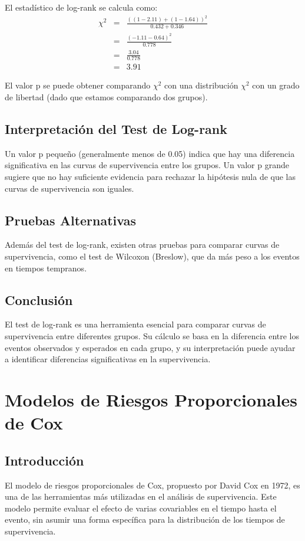 \documentclass[a4paper]{report} %
\begin{document}
El estad\'istico de log-rank se calcula como:
\begin{eqnarray*}
\chi^2 &=& \frac{\left((1 - 2.11) + (1 - 1.64)\right)^2}{0.432 + 0.346} \\
       &=& \frac{\left(-1.11 - 0.64\right)^2}{0.778} \\
       &=& \frac{3.04}{0.778} \\
       &=& 3.91
\end{eqnarray*}

El valor p se puede obtener comparando $\chi^2$ con una distribuci\'on $\chi^2$ con un grado de libertad (dado que estamos comparando dos grupos).

\section{Interpretaci\'on del Test de Log-rank}
Un valor p peque\~no (generalmente menos de 0.05) indica que hay una diferencia significativa en las curvas de supervivencia entre los grupos. Un valor p grande sugiere que no hay suficiente evidencia para rechazar la hip\'otesis nula de que las curvas de supervivencia son iguales.

\section{Pruebas Alternativas}
Adem\'as del test de log-rank, existen otras pruebas para comparar curvas de supervivencia, como el test de Wilcoxon (Breslow), que da m\'as peso a los eventos en tiempos tempranos.

\section{Conclusi\'on}
El test de log-rank es una herramienta esencial para comparar curvas de supervivencia entre diferentes grupos. Su c\'alculo se basa en la diferencia entre los eventos observados y esperados en cada grupo, y su interpretaci\'on puede ayudar a identificar diferencias significativas en la supervivencia.


\chapter{Modelos de Riesgos Proporcionales de Cox}
\section{Introducci\'on}
El modelo de riesgos proporcionales de Cox, propuesto por David Cox en 1972, es una de las herramientas m\'as utilizadas en el an\'alisis de supervivencia. Este modelo permite evaluar el efecto de varias covariables en el tiempo hasta el evento, sin asumir una forma espec\'ifica para la distribuci\'on de los tiempos de supervivencia.
\end{document}
